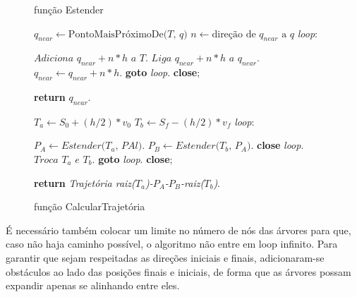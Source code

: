 \documentclass[a4paper,12pt]{article}
\begin{document}
\begin{figure}[ttt!]

\begin{minipage}[t]{0.5\textwidth}

\begin{algorithm}[H]
\caption{função Estender}\label{euclid}
\begin{algorithmic}[1]
\State $\textit{$q_{near}$} \gets \text{PontoMaisPróximoDe($T$, $q$)}$
\State $\textit{$n$} \gets \text{direção de $q_{near}$ a $q$}$
\BState \emph{loop}:

\State $\textit{Adiciona $q_{near}+n*h$ a $T$}$.
\State $\textit{Liga $q_{near}+n*h$ a $q_{near}$}$.
\State $q_{near} \gets q_{near}+n*h$.
\State \textbf{goto} \emph{loop}.
\State \textbf{close};
\EndIf

\State \textbf{return} \emph{$q_{near}$}.
\EndProcedure
\end{algorithmic}
\end{algorithm}

\end{minipage}
\hfill
\begin{minipage}[t]{0.5\textwidth}

\begin{algorithm}[H]
\caption{função CalcularTrajetória}\label{euclid}
\begin{algorithmic}[1]
\State $T_{a} \gets S_{0}+(h/2)*v_{0}$
\State $T_{b} \gets S_{f}-(h/2)*v_{f}$
\BState \emph{loop}:

\State $P_A \gets \textit{Estender($T_{a}$, PAl)}$.
\State $P_B \gets \textit{Estender($T_{b}$, $P_A$)}$.
\State \textbf{close} \emph{loop}.
\EndIf
\State $\textit{Troca $T_{a}$ e $T_{b}$}$.
\State \textbf{goto} \emph{loop}.
\State \textbf{close};
\EndIf

\State \textbf{return} \emph{Trajetória raiz($T_{a}$)-$P_A$-$P_B$-raiz($T_{b}$)}.
\EndProcedure
\end{algorithmic}
\end{algorithm}

 \end{minipage}

 \hfill

\end{figure}

É necessário também colocar um limite no número de nós das árvores para que, caso não haja caminho possível, o algoritmo não entre em loop infinito. Para garantir que sejam respeitadas as direções iniciais e finais, adicionaram-se obstáculos ao lado das posições finais e iniciais, de forma que as árvores possam expandir apenas se alinhando entre eles.
\end{document}
